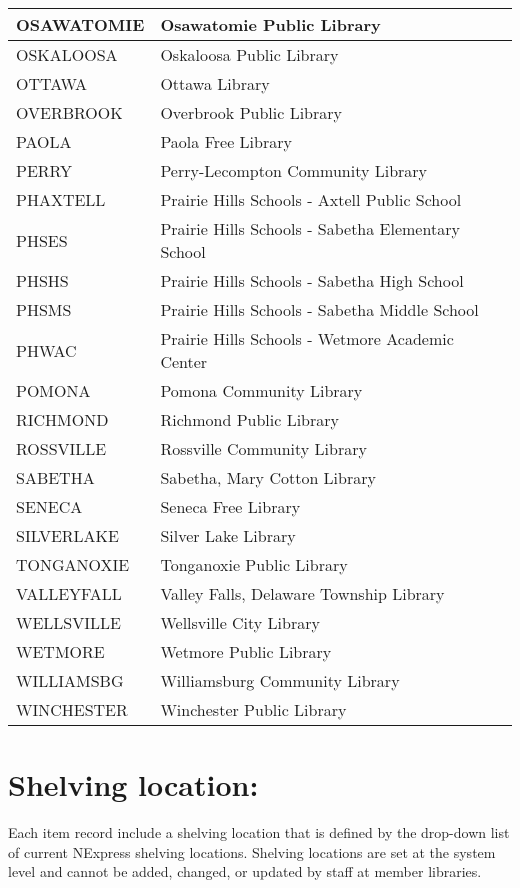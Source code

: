 \documentclass[letterpaper,10pt,english]{sphinxmanual}
\begin{document}
\begin{savenotes}
\begin{longtable}{|l|l|}
\hline
OSAWATOMIE
&
Osawatomie Public Library
\\
\hline
OSKALOOSA
&
Oskaloosa Public Library
\\
\hline
OTTAWA
&
Ottawa Library
\\
\hline
OVERBROOK
&
Overbrook Public Library
\\
\hline
PAOLA
&
Paola Free Library
\\
\hline
PERRY
&
Perry-Lecompton Community Library
\\
\hline
PHAXTELL
&
Prairie Hills Schools - Axtell Public School
\\
\hline
PHSES
&
Prairie Hills Schools - Sabetha Elementary School
\\
\hline
PHSHS
&
Prairie Hills Schools - Sabetha High School
\\
\hline
PHSMS
&
Prairie Hills Schools - Sabetha Middle School
\\
\hline
PHWAC
&
Prairie Hills Schools - Wetmore Academic Center
\\
\hline
POMONA
&
Pomona Community Library
\\
\hline
RICHMOND
&
Richmond Public Library
\\
\hline
ROSSVILLE
&
Rossville Community Library
\\
\hline
SABETHA
&
Sabetha, Mary Cotton Library
\\
\hline
SENECA
&
Seneca Free Library
\\
\hline
SILVERLAKE
&
Silver Lake Library
\\
\hline
TONGANOXIE
&
Tonganoxie Public Library
\\
\hline
VALLEYFALL
&
Valley Falls, Delaware Township Library
\\
\hline
WELLSVILLE
&
Wellsville City Library
\\
\hline
WETMORE
&
Wetmore Public Library
\\
\hline
WILLIAMSBG
&
Williamsburg Community Library
\\
\hline
WINCHESTER
&
Winchester Public Library
\\
\hline
\end{longtable}\sphinxatlongtableend\end{savenotes}


\section{Shelving location:}
\label{\detokenize{classification:shelving-location}}
Each item record  include a shelving location that is defined by
the drop-down list of current NExpress shelving locations. Shelving
locations are set at the system level and cannot be added, changed, or
updated by staff at member libraries.
\end{document}
